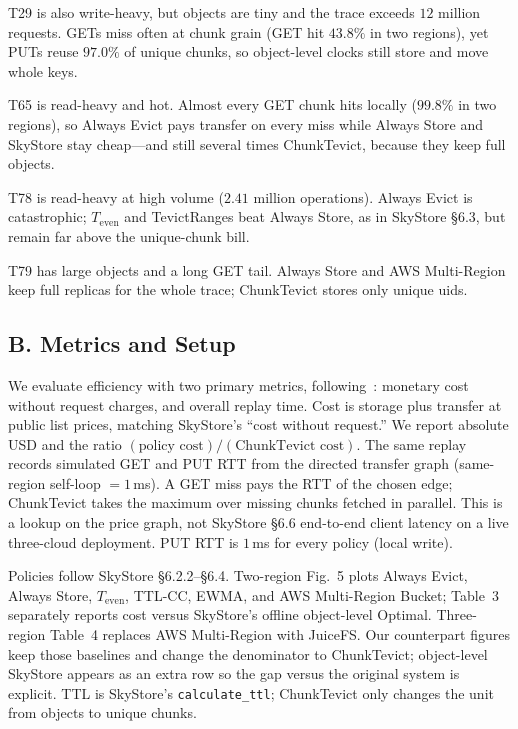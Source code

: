 {T}29 is also write-heavy, but objects are tiny and the trace exceeds $12$ million requests.
{GET}s miss often at chunk grain ({GET} hit $43.8\%$ in two regions), yet {PUT}s reuse $97.0\%$ of unique chunks, so object-level clocks still store and move whole keys.

{T}65 is read-heavy and hot.
Almost every {GET} chunk hits locally ($99.8\%$ in two regions), so Always Evict pays transfer on every miss while Always Store and SkyStore stay cheap---and still several times ChunkTevict, because they keep full objects.

{T}78 is read-heavy at high volume ($2.41$ million operations).
Always Evict is catastrophic; $T_{\mathrm{even}}$ and TevictRanges beat Always Store, as in SkyStore §6.3, but remain far above the unique-chunk bill.

{T}79 has large objects and a long {GET} tail.
Always Store and {AWS} Multi-Region keep full replicas for the whole trace; ChunkTevict stores only unique uids.

\subsection{B. Metrics and Setup}
\label{sec:eval-metrics}

We evaluate efficiency with two primary metrics, following~\cite{ye2021fast}: monetary cost without request charges, and overall replay time.
Cost is storage plus transfer at public list prices, matching SkyStore's ``cost without request.''
We report absolute {USD} and the ratio $(\text{policy cost})/(\text{ChunkTevict cost})$.
The same replay records simulated {GET} and {PUT} {RTT} from the directed transfer graph (same-region self-loop $=1$\,ms).
A {GET} miss pays the {RTT} of the chosen edge; ChunkTevict takes the maximum over missing chunks fetched in parallel.
This is a lookup on the price graph, not SkyStore §6.6 end-to-end client latency on a live three-cloud deployment.
{PUT} {RTT} is $1$\,ms for every policy (local write).

Policies follow SkyStore §6.2.2--§6.4.
Two-region Fig.~5 plots Always Evict, Always Store, $T_{\mathrm{even}}$, {TTL}-{CC}, {EWMA}, and {AWS} Multi-Region Bucket; Table~3 separately reports cost versus SkyStore's offline object-level Optimal.
Three-region Table~4 replaces {AWS} Multi-Region with JuiceFS.
Our counterpart figures keep those baselines and change the denominator to ChunkTevict; object-level SkyStore appears as an extra row so the gap versus the original system is explicit.
{TTL} is SkyStore's \texttt{calculate\_ttl}; ChunkTevict only changes the unit from objects to unique chunks.

